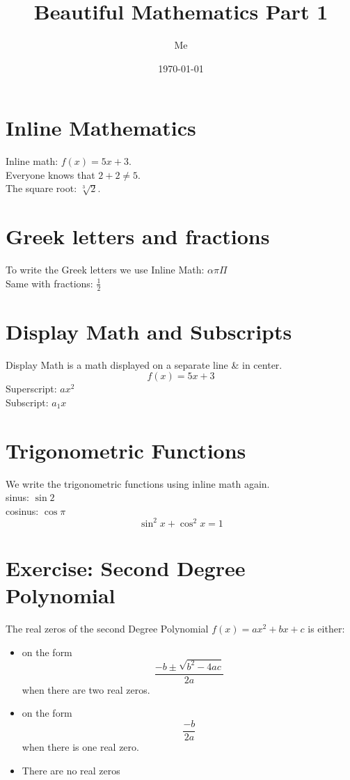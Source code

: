 \documentclass[12pt, titlepage]{article}
\title{Beautiful Mathematics Part 1}
\author{Me}
\date{\today}
\begin{document}
\maketitle

\newpage
\tableofcontents
\newpage

\section{Inline Mathematics}
Inline math: $f(x) = 5x + 3$. \\
Everyone knows that $2 + 2 \neq 5$. \\
The square root: $\sqrt[3]{2}$.

\section{Greek letters and fractions}
To write the Greek letters we use Inline Math: $\alpha \pi \Pi$ \\[0.5em]
Same with fractions: $\frac{1}{2}$

\section{Display Math and Subscripts}
Display Math is a math displayed on a separate line \& in center.
\[f(x) = 5x + 3\]
Superscript: $ax^2$ \\
Subscript: $a_1x$

\section{Trigonometric Functions}
We write the trigonometric functions using inline math again. \\
sinus: $\sin{2}$ \\
cosinus: $\cos{\pi}$
\[\sin^{2}{x} + \cos^{2}{x} = 1\]

\newpage
\section{Exercise: Second Degree Polynomial}
The real zeros of the second Degree Polynomial $f(x) = ax^2 + bx + c$ is either:
\begin{itemize}
    \item on the form
    \[\frac{-b \pm \sqrt{b^2 - 4ac}}{2a}\]
    when there are two real zeros.
    \item on the form
    \[\frac{-b}{2a}\]
    when there is one real zero.
    \item There are no real zeros
\end{itemize}
\end{document}
